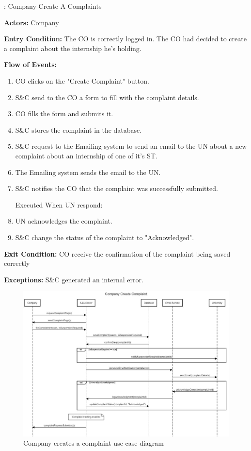 \nextUseCaseID: Company Create A Complaints

\par \textbf{Actors:} Company

\par \textbf{Entry Condition:} The CO is correctly logged in. The CO had decided to create a complaint about the internship he's holding.

\par \textbf{Flow of Events:}

\begin{enumerate}
    \item CO clicks on the "Create Complaint" button.
    \item S\&C send to the CO a form to fill with the complaint details.
    \item CO fills the form and submits it.
    \item S\&C stores the complaint in the database.
    \item S\&C request to the Emailing system to send an email to the UN about a new complaint about an internship of one of it's ST.
    \item The Emailing system sends the email to the UN.
    \item S\&C notifies the CO that the complaint was successfully submitted.

    Executed When UN respond:
    \item UN acknowledges the complaint.
    \item S\&C change the status of the complaint to "Acknowledged".
\end{enumerate}

\par \textbf{Exit Condition:} CO receive the confirmation of the complaint being saved correctly

\par \textbf{Exceptions:}  S\&C generated an internal error.

\begin{figure}[H]
    \centering
    \includegraphics[width=1.0\textwidth]{Images/UC_13.pdf}
    \caption{Company creates a complaint use case diagram}
    \label{fig:use-case-diagram-13}
\end{figure}

